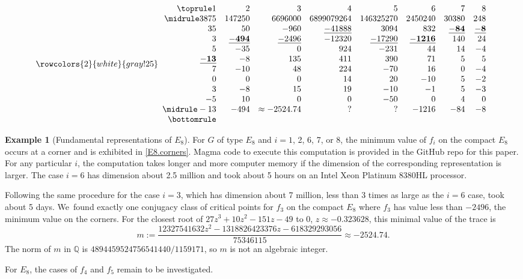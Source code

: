\documentclass[JEP,XML,SOM,Unicode,NoFloatCountersInSection,published]{cedram}
\theoremstyle{definition}
\newtheorem{example}[equation]{Example}
\newcommand{\Q}{\mathbb{Q}}
\begin{document}
\begin{table}[htbp]
\caption{Value of $f_i$ on each of the 9 corners of $E_8$. The top row gives~$i$, the bottom row gives the actual minimum of $f_i$.} \label{E8.corners}
\[
{\rowcolors{2}{white}{gray!25}
\begin{array}{rrrrrrrr}\toprule
1&2&3&4&5&6&7&8 \\ \midrule
3875& 147250& 6696000& 6899079264& 146325270& 2450240& 30380& 248 \\
35& 50& -960& \underline{-41888}& 3094& 832& \underline{\mathbf{-84}}& \underline{\mathbf{-8}} \\
3& \underline{\mathbf{-494}}& \underline{-2496}& -12320& \underline{-17290}& \underline{\mathbf{-1216}}& 140& 24 \\
5& -35& 0& 924& -231& 44& 14& -4 \\
\underline{\mathbf{-13}}& -8& 135& 411& 390& 71& 5& 5 \\
7& -10& 48& 224& -70& 16& 0& -4 \\
0& 0& 0& 14& 20& -10& 5& -2 \\
3& -8& 15& 19& -10& -1& 5& -3 \\
-5& 10& 0& 0& -50& 0& 4& 0 \\ \midrule
-13&-494&\approx -2524.74&?&?&-1216&-84&-8 \\ \bottomrule
\end{array}}
\]
\end{table}

\begin{example}[Fundamental representations of $E_8$] \label{E8.eg}
For $G$ of type $E_8$ and $i = 1$, 2, 6, 7, or 8, the minimum value of $f_i$ on the compact $E_8$ occurs at a corner and is exhibited in \autoref{E8.corners}. Magma code to execute this computation is provided in the GitHub repo for this paper. For any particular $i$, the computation takes longer and more computer memory if the dimension of the corresponding representation is larger. The case $i =6$ has dimension about 2.5 million and took about 5 hours on an Intel Xeon Platinum 8380HL processor.

Following the same procedure for the case $i = 3$, which has dimension about 7 million, less than 3 times as large as the $i = 6$ case, took about 5 days. We~found exactly one conjugacy class of critical points for $f_3$
on the compact $E_8$ where $f_3$ has value less than $-2496$, the minimum value on the corners. For the closest root of $27z^3+10z^2-151z-49$ to 0, $z \approx -0.323628$, this minimal value of the trace is
\[
m := \frac{12327541632z^2 - 1318826423376z - 618329293056}{75346115} \approx -2524.74.
\]
The norm of $m$ in $\Q$ is $4894459524756541440/1159171$, so $m$ is not an algebraic integer.

For $E_8$, the cases of $f_4$ and $f_5$ remain to be investigated.
\end{example}
\end{document}
